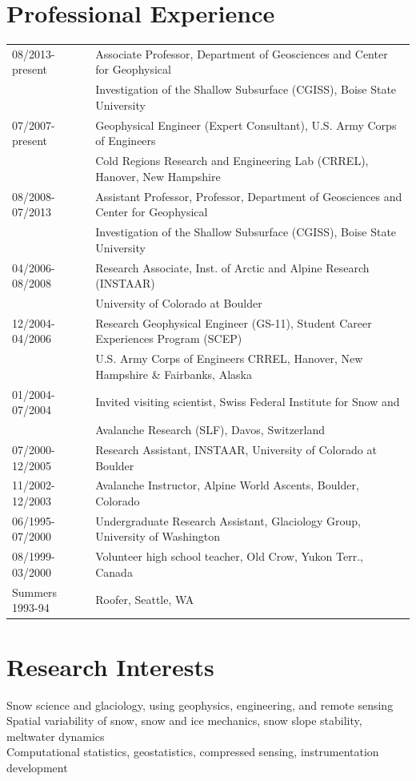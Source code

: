 \documentclass[11pt]{article}
\begin{document}
\section*{Professional Experience}
\begin{tabular}{ll}
08/2013-present & Associate Professor, Department of Geosciences and Center for Geophysical \\
&   Investigation of the Shallow Subsurface (CGISS), Boise State University \\
07/2007-present & Geophysical Engineer (Expert Consultant), U.S. Army Corps of Engineers \\
& Cold Regions Research and Engineering Lab (CRREL), Hanover, New Hampshire \\
08/2008-07/2013 & Assistant Professor, Professor, Department of Geosciences and Center for Geophysical \\
&   Investigation of the Shallow Subsurface (CGISS), Boise State University \\
04/2006-08/2008 & Research Associate, Inst. of Arctic and Alpine Research (INSTAAR) \\
& University of Colorado at Boulder \\ 
12/2004-04/2006 & Research Geophysical Engineer (GS-11), Student Career Experiences Program (SCEP) \\
& U.S. Army Corps of Engineers CRREL, Hanover, New Hampshire \& Fairbanks, Alaska \\
01/2004-07/2004 & Invited visiting scientist, Swiss Federal Institute for Snow and \\ 
& Avalanche Research (SLF), Davos, Switzerland \\ 
07/2000-12/2005 & Research Assistant, INSTAAR, University of Colorado at Boulder \\
11/2002-12/2003 & Avalanche Instructor, Alpine World Ascents, Boulder, Colorado \\
06/1995-07/2000 & Undergraduate Research Assistant, Glaciology Group, University of Washington \\
08/1999-03/2000 & Volunteer high school teacher, Old Crow, Yukon Terr., Canada \\
Summers 1993-94 & Roofer, Seattle, WA \\
\end{tabular}

\section*{Research Interests}
Snow science and glaciology, using geophysics, engineering, and remote sensing \\
Spatial variability of snow, snow and ice mechanics, snow slope stability, meltwater dynamics \\
Computational statistics, geostatistics, compressed sensing, instrumentation development \\
\end{document}
